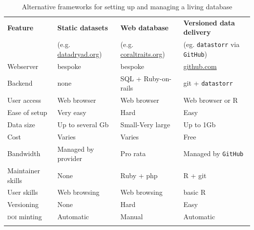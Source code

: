 \documentclass[a4paper,11pt]{article}
\newcommand{\smurl}[1]{{\footnotesize\url{#1}}}
\begin{document}
\begin{table}[h!]
\centering
\caption{Alternative frameworks for setting up and managing a living database}
{\footnotesize
\vspace{1cm}
  \begin{tabular}{p{2.5cm}p{3.5cm}p{3.5cm}p{4cm}}
  \hline
  \textbf{Feature} & \textbf{Static datasets}& \textbf{Web database} & \textbf{Versioned data delivery}\\
  \textbf{} & (e.g. \smurl{datadryad.org})& (e.g. \smurl{coraltraits.org}) & (eg. \texttt{datastorr} via \texttt{GitHub})\\
  \hline
   Webserver        & bespoke & bespoke &  \smurl{github.com}\\
   Backend          & none & SQL + Ruby-on-rails 			& git + \texttt{datastorr} \\
   User access      & Web browser & Web browser 				    & Web browser or R \\
   Ease of setup    & Very easy & Hard 							& Easy\\
   Data size        & Up to several Gb & Small-Very large 				& Up to 1Gb\\
   Cost             & Varies & Varies  						& Free \\
   Bandwidth        & Managed by provider & Pro rata 						& Managed by \texttt{GitHub}\\
   Maintainer skills & None & Ruby + php 					& R + git \\
   User skills      &Web browsing& Web browsing  					& basic R \\
   Versioning       &None& Hard 							& Easy \\
   \textsc{doi} minting      &Automatic & Manual 					& Automatic \\
  \hline 
  \\
 
  \end{tabular}
  } 
\label{tab:sql_v_versioneddata}
\end{table}

\newpage
\end{document}
